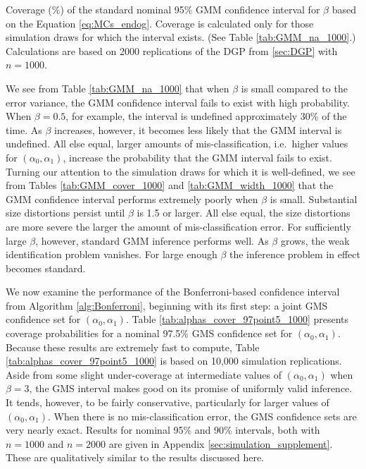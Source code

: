 \begin{table}[htbp]
  \small
  \centering
  
  \caption{Coverage (\%) of the standard nominal 95\% GMM confidence interval for $\beta$ based on the Equation \ref{eq:MCs_endog}. Coverage is calculated only for those simulation draws for which the interval exists. (See Table \ref{tab:GMM_na_1000}.) Calculations are based on 2000 replications of the DGP from \ref{sec:DGP} with $n = 1000$.} 
  \label{tab:GMM_cover_1000}
\end{table}


We see from Table \ref{tab:GMM_na_1000} that when $\beta$ is small compared to the error variance, the GMM confidence interval fails to exist with high probability.
When $\beta = 0.5$, for example, the interval is undefined approximately 30\% of the time.
As $\beta$ increases, however, it becomes less likely that the GMM interval is undefined.
All else equal, larger amounts of mis-classification, i.e.\ higher values for $(\alpha_0, \alpha_1)$, increase the probability that the GMM interval fails to exist.
Turning our attention to the simulation draws for which it is well-defined, we see from Tables \ref{tab:GMM_cover_1000} and \ref{tab:GMM_width_1000} that the GMM confidence interval performs extremely poorly when $\beta$ is small.
Substantial size distortions persist until $\beta$ is 1.5 or larger.
All else equal, the size distortions are more severe the larger the amount of mis-classification error.
For sufficiently large $\beta$, however, standard GMM inference performs well.
As $\beta$ grows, the weak identification problem vanishes.
For large enough $\beta$ the inference problem in effect becomes standard.

We now examine the performance of the Bonferroni-based confidence interval from Algorithm \ref{alg:Bonferroni}, beginning with its first step: a joint GMS confidence set for $(\alpha_0, \alpha_1)$.
Table \ref{tab:alphas_cover_97point5_1000} presents coverage probabilities for a nominal 97.5\% GMS confidence set for $(\alpha_0, \alpha_1)$.
Because these results are extremely fast to compute, Table \ref{tab:alphas_cover_97point5_1000} is based on 10,000 simulation replications. 
Aside from some slight under-coverage at intermediate values of $(\alpha_0, \alpha_1)$ when $\beta = 3$, the GMS interval makes good on its promise of uniformly valid inference.
It tends, however, to be fairly conservative, particularly for larger values of $(\alpha_0, \alpha_1)$.
When there is no mis-classification error, the GMS confidence sets are very nearly exact.
Results for nominal 95\% and 90\% intervals, both with $n = 1000$ and $n=2000$ are given in Appendix \ref{sec:simulation_supplement}.
These are qualitatively similar to the results discussed here.

